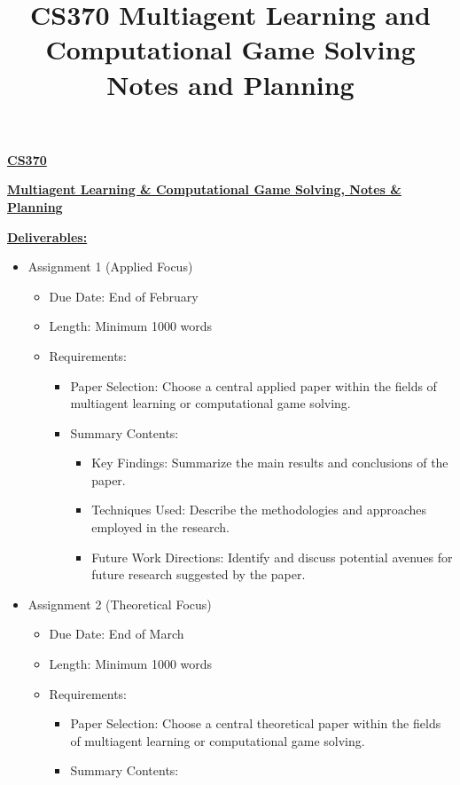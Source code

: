 \documentclass[
]{article}
\title{CS370 Multiagent Learning and Computational Game Solving Notes
and Planning}
\author{}
\date{}
\begin{document}
\maketitle

\textbf{\ul{CS370}}

\textbf{\ul{Multiagent Learning \& Computational Game Solving, Notes \&
Planning}}

\textbf{\ul{Deliverables:}}

\begin{itemize}
\item
  Assignment 1 (Applied Focus)

  \begin{itemize}
  \item
    Due Date: End of February
  \item
    Length: Minimum 1000 words
  \item
    Requirements:

    \begin{itemize}
    \item
      Paper Selection: Choose a central applied paper within the fields
      of multiagent learning or computational game solving.
    \item
      Summary Contents:

      \begin{itemize}
      \item
        Key Findings: Summarize the main results and conclusions of the
        paper.
      \item
        Techniques Used: Describe the methodologies and approaches
        employed in the research.
      \item
        Future Work Directions: Identify and discuss potential avenues
        for future research suggested by the paper.
      \end{itemize}
    \end{itemize}
  \end{itemize}
\item
  Assignment 2 (Theoretical Focus)

  \begin{itemize}
  \item
    Due Date: End of March
  \item
    Length: Minimum 1000 words
  \item
    Requirements:

    \begin{itemize}
    \item
      Paper Selection: Choose a central theoretical paper within the
      fields of multiagent learning or computational game solving.
    \item
      Summary Contents:


\end{itemize}
\end{itemize}
\end{itemize}
\end{document}
